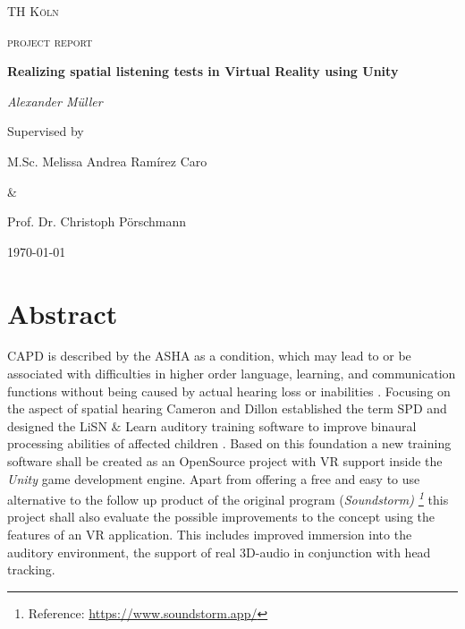 \documentclass[a4paper,11pt]{article}%
\renewcommand{\\}{\vspace*{0.5\baselineskip} \newline}
\begin{document}

\begin{titlepage}
	\centering
	{\scshape\LARGE TH Köln \par}
	\vspace{1cm}
	{\scshape\Large project report\par}
	\vspace{1.5cm}
	{\huge\bfseries Realizing spatial listening tests in Virtual Reality using Unity\par}
	\vspace{2cm}
	{\Large\itshape Alexander Müller \par}
	\vfill
	Supervised by\par
	M.Sc. Melissa Andrea Ramírez Caro \par \&  \par Prof. Dr. Christoph Pörschmann
	\vfill

	{\large \today\par}
\end{titlepage}


\newpage

\tableofcontents
\newpage



\section*{Abstract}
\ac{CAPD} is described by the \ac{ASHA} as a condition, which \dq may lead to or be associated with difficulties in higher order language, learning, and communication functions\dq{} without being caused by actual hearing loss or inabilities \cite{ASHA}. Focusing on the aspect of spatial hearing Cameron and Dillon established the term \ac{SPD} and designed the \ac{LiSN} $\&$ Learn auditory training software to improve binaural processing abilities of affected children \cite{LiSN-A}.
\newline
\newline
Based on this foundation a new training software shall be created as an OpenSource project with \ac{VR} support inside the \textit{Unity} game development engine. Apart from offering a free and easy to use alternative to the follow up product of the original program (\textit{Soundstorm) \footnote{Reference: \url{https://www.soundstorm.app/}}} this project shall also evaluate the possible improvements to the concept using the features of an \ac{VR} application. This includes improved immersion into the auditory environment, the support of real 3D-audio in conjunction with head tracking.
\end{document}
